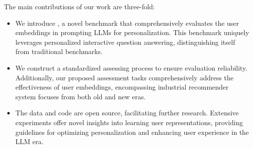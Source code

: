 The main contributions of our work are three-fold:

\begin{itemize}[leftmargin=*]

\item We introduce \name, a novel benchmark that comprehensively evaluates the user embeddings in prompting LLMs for personalization. This benchmark uniquely leverages personalized interactive question answering, distinguishing itself from traditional benchmarks.


\item We construct a standardized assessing process to ensure evaluation reliability. 
Additionally, our proposed assessment tasks comprehensively address the effectiveness of user embeddings, encompassing industrial recommender system focuses from both old and new eras.

\item The data and code are open source, facilitating further research. Extensive experiments offer novel insights into learning user representations, providing guidelines for optimizing personalization and enhancing user experience in the LLM era.  

\end{itemize}





